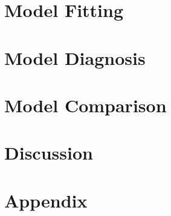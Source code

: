 \documentclass{svjour3}
\begin{document}
\section{Model Fitting}\label{sec:model_fitting}


\section{Model Diagnosis}\label{sec:diag}


\section{Model Comparison}\label{sec:model_comp}


\section{Discussion}\label{sec:discussion}


\appendix
\section{Appendix}\label{sec:appendix}

\end{document}
